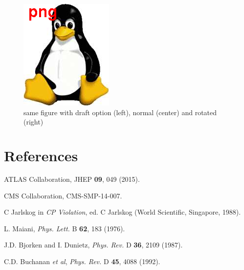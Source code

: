 \documentclass{blois}
\def\Journal#1#2#3#4{{#1} {\bf #2}, #3 (#4)}
\def\PLB{{\em Phys. Lett.}  B}
\def\PRD{{\em Phys. Rev.} D}
\begin{document}
\begin{figure}
\begin{minipage}{0.32\linewidth}
\centerline{\includegraphics[angle=-45,width=0.7\linewidth]{figexamp}}
\end{minipage}
\caption[]{same figure with draft option (left), normal (center) and rotated (right)}
\label{fig:radish}
\end{figure}


\section*{References}

\begin{thebibliography}{99}

ATLAS Collaboration, \Journal{JHEP}{09}{049}{2015}.

CMS Collaboration, CMS-SMP-14-007.

C Jarlskog in {\em CP Violation}, ed. C Jarlskog
(World Scientific, Singapore, 1988).

L. Maiani, \Journal{\PLB}{62}{183}{1976}.

J.D. Bjorken and I. Dunietz, \Journal{\PRD}{36}{2109}{1987}.

C.D. Buchanan {\it et al}, \Journal{\PRD}{45}{4088}{1992}.

\end{thebibliography}
\end{document}
